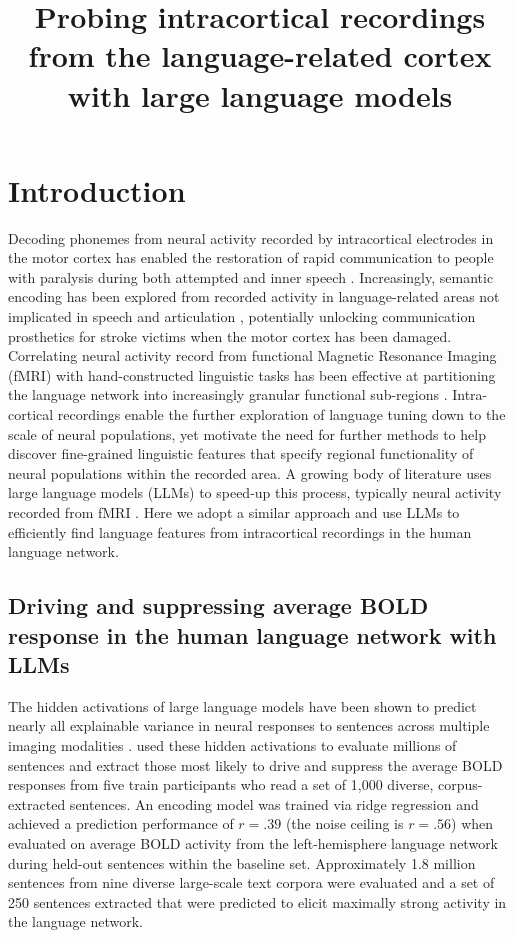 \documentclass[11pt]{article}
\title{Probing intracortical recordings from the language-related cortex with large language models}
\date{}
\author{}
\begin{document}
\maketitle

\vspace{-1cm}
\section{Introduction}
Decoding phonemes from neural activity recorded by intracortical electrodes in the motor cortex has enabled the restoration of rapid communication to people with paralysis during both attempted and inner speech  \cite{willett2023speech}\cite{kunz2025innerspeech}. Increasingly, semantic encoding has been explored from recorded activity in language-related areas not implicated in speech and articulation \cite{jamali2024semantic}\cite{cai2026language}, potentially unlocking communication prosthetics for stroke victims when the motor cortex has been damaged. Correlating neural activity record from functional Magnetic Resonance Imaging (fMRI) with hand-constructed linguistic tasks has been effective at partitioning the language network into increasingly granular functional sub-regions \cite{Price2012}\cite{clos2013tackling}. Intra-cortical recordings enable the further exploration of language tuning down to the scale of neural populations, yet motivate the need for further methods to help discover fine-grained linguistic features that specify regional functionality of neural populations within the recorded area. A growing body of literature uses large language models (LLMs) to speed-up this process, typically neural activity recorded from fMRI \cite{tuckute2023driving}. Here we adopt a similar approach and use LLMs to efficiently find language features from intracortical recordings in the human language network.

\subsection{Driving and suppressing average BOLD response in the human language network  with LLMs}

The hidden activations of large language models have been shown to predict nearly all explainable variance in neural responses to sentences across multiple imaging modalities \cite{schrimpf2021neural}. \citet{tuckute2023driving} used these hidden activations to evaluate millions of sentences and extract those most likely to drive and suppress the average BOLD responses from five train participants who read a set of 1,000 diverse, corpus-extracted sentences. An encoding model was trained via ridge regression and achieved a prediction performance of $r=.39$ (the noise ceiling is $r=.56$) when evaluated on average BOLD activity from the left-hemisphere language network during held-out sentences within the baseline set. Approximately 1.8 million sentences from nine diverse large-scale text corpora were evaluated and a set of 250 sentences extracted  that were predicted to elicit maximally strong activity in the language network.
\end{document}
